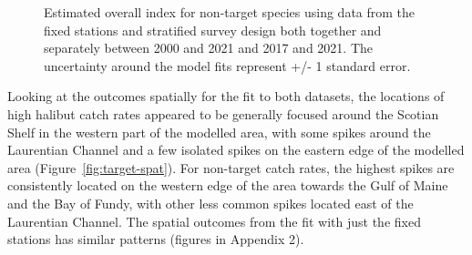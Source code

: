 \documentclass[12pt]{article}\usepackage[]{graphicx}\usepackage[]{color}
\begin{document}
\begin{figure}[htb]

{\centering {}  

}

\caption{Estimated overall index for non-target species using data from the fixed stations and stratified survey design both together and separately between 2000 and 2021 and 2017 and 2021. The uncertainty around the model fits represent +/- 1 standard error.}\label{fig:non-t-indices}
\end{figure}
Looking at the outcomes spatially for the fit to both datasets, the locations of high halibut catch rates appeared to be generally focused around the Scotian Shelf in the western part of the modelled area, with some spikes around the Laurentian Channel and a few isolated spikes on the eastern edge of the modelled area (Figure~\ref{fig:target-spat}). For non-target catch rates, the highest spikes are consistently located on the western edge of the area towards the Gulf of Maine and the Bay of Fundy, with other less common spikes located east of the Laurentian Channel. The spatial outcomes from the fit with just the fixed stations has similar patterns (figures in Appendix 2).
\end{document}
